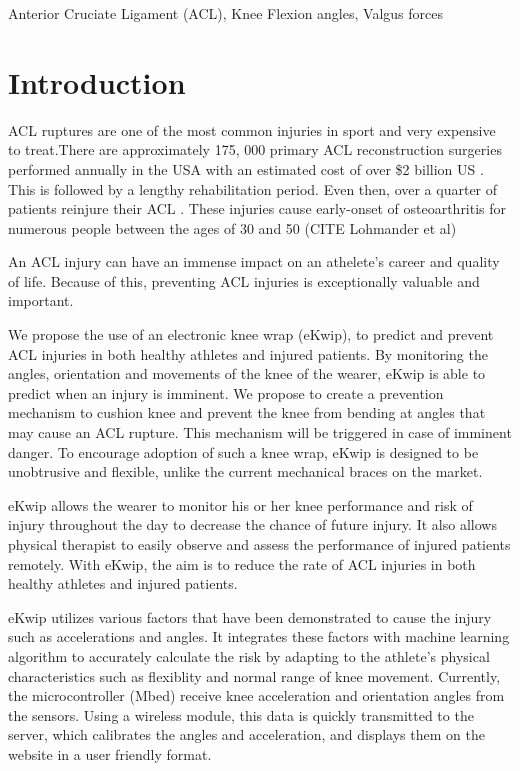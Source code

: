\documentclass{sig-alternate}
\begin{document}
\begin{keywords}
	Anterior Cruciate Ligament (ACL),  Knee Flexion angles, Valgus forces
\end{keywords}

\section{Introduction}
\label{sec:intro}
ACL ruptures are one of the most common injuries in sport and very expensive to treat.There are approximately 175, 000 primary ACL reconstruction surgeries performed annually in the USA with an estimated cost of over \$2 billion US \cite{yu2007mechanisms}. This is followed by a lengthy rehabilitation period. Even then, over a quarter of patients reinjure their ACL \cite{stevenson1998gender}. These injuries cause early-onset of osteoarthritis for numerous people between the ages of 30 and 50 \FIXME(CITE Lohmander et al)

An ACL injury can have an immense impact on an athelete's career and quality of life. Because of this, preventing ACL injuries is exceptionally valuable and important.

We propose the use of an electronic knee wrap (eKwip), to predict and prevent ACL injuries in both healthy athletes and injured patients. By monitoring the angles, orientation and movements of the knee of the wearer, eKwip is able to predict when an injury is imminent. We propose to create a prevention mechanism to cushion knee and prevent the knee from bending at angles that may cause an ACL rupture. This mechanism will be triggered in case of imminent danger. To encourage adoption of such a knee wrap, eKwip is designed to be unobtrusive and flexible, unlike the current mechanical braces on the market.

eKwip allows the wearer to monitor his or her knee performance and risk of injury throughout the day to decrease the chance of future injury. It also allows physical therapist to easily observe and assess the performance of injured patients remotely. With eKwip, the aim is to reduce the rate of ACL injuries in both healthy athletes and injured patients.

eKwip utilizes various factors that have been demonstrated to cause the injury such as accelerations and angles. It integrates these factors with machine learning algorithm to accurately calculate the risk by adapting to the athlete's physical characteristics such as flexiblity and normal range of knee movement. Currently, the microcontroller (Mbed) receive knee acceleration and orientation angles from the sensors. Using a wireless module, this data is quickly transmitted to the server, which calibrates the angles and acceleration, and displays them on the website in a user friendly format.
\end{document}
